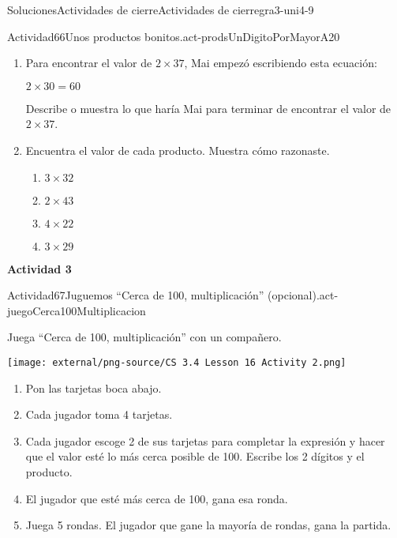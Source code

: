 \documentclass[twoside,10pt,]{article}
\begin{document}
\begin{solutions-section}{Soluciones}{Actividades de cierre}{}{Actividades de cierre}{}{}{gra3-uni4-9}
\begin{activitysolution}{Actividad}{66}{Unos productos bonitos.}{act-prodsUnDigitoPorMayorA20}
%
\begin{enumerate}
\item{}Para encontrar el valor de \(2\times 37\), Mai empezó escribiendo esta ecuación:%
\par
\(2 \times 30 = 60\)%
\par
Describe o muestra lo que haría Mai para terminar de encontrar el valor de \(2\times 37\).%
\item{}Encuentra el valor de cada producto. Muestra cómo razonaste.%
%
\begin{enumerate}
\item{}\(\displaystyle 3\times 32\)%
\item{}\(\displaystyle 2\times 43\)%
\item{}\(\displaystyle 4\times 22\)%
\item{}\(\displaystyle 3\times 29\)%
\end{enumerate}
\end{enumerate}
\end{activitysolution}%
\par\medskip
\noindent\textbf{\large{}\space\textperiodcentered\space{}Actividad 3}
\begin{activitysolution}{Actividad}{67}{Juguemos “Cerca de 100, multiplicación” (opcional).}{act-juegoCerca100Multiplicacion}%
\begin{sidebyside}{2}{0.05}{0.05}{0.1}%
\begin{sbspanel}{0.5}%
Juega “Cerca de 100, multiplicación” con un compañero.%
\end{sbspanel}%
\begin{sbspanel}{0.3}%
\texttt{[image: external/png-source/CS 3.4 Lesson 16 Activity 2.png]}
\end{sbspanel}%
\end{sidebyside}%
%
\begin{enumerate}
\item{}Pon las tarjetas boca abajo.%
\item{}Cada jugador toma 4 tarjetas.%
\item{}Cada jugador escoge 2 de sus tarjetas para completar la expresión y hacer que el valor esté lo más cerca posible de 100. Escribe los 2 dígitos y el producto.%
\item{}El jugador que esté más cerca de 100, gana esa ronda.%
\item{}Juega 5 rondas. El jugador que gane la mayoría de rondas, gana la partida.%
\end{enumerate}
\begin{sidebyside}{2}{0}{0}{0.1}%

\end{sidebyside}
\end{activitysolution}
\end{solutions-section}
\end{document}
